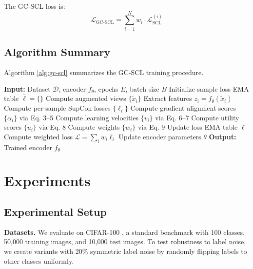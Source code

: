 \documentclass{article}
\begin{document}
The GC-SCL loss is:
\begin{equation}
\mathcal{L}_{\text{GC-SCL}} = \sum_{i=1}^N w_i \cdot \mathcal{L}_{\text{SCL}}^{(i)}
\end{equation}

\subsection{Algorithm Summary}

Algorithm \ref{alg:gc-scl} summarizes the GC-SCL training procedure.

\begin{algorithm}[t]
\caption{GC-SCL Training}
\label{alg:gc-scl}
\begin{algorithmic}
\STATE \textbf{Input:} Dataset $\mathcal{D}$, encoder $f_\theta$, epochs $E$, batch size $B$
\STATE Initialize sample loss EMA table $\bar{\ell} = \{\}$
        \STATE Compute augmented views $\{\tilde{x}_i\}$
        \STATE Extract features $z_i = f_\theta(\tilde{x}_i)$
        \STATE Compute per-sample SupCon losses $\{\ell_i\}$
        \STATE Compute gradient alignment scores $\{\alpha_i\}$ via Eq. 3--5
        \STATE Compute learning velocities $\{v_i\}$ via Eq. 6--7
        \STATE Compute utility scores $\{u_i\}$ via Eq. 8
        \STATE Compute weights $\{w_i\}$ via Eq. 9
        \STATE Update loss EMA table $\bar{\ell}$
        \STATE Compute weighted loss $\mathcal{L} = \sum_i w_i \ell_i$
        \STATE Update encoder parameters $\theta$
    \ENDFOR
\ENDFOR
\STATE \textbf{Output:} Trained encoder $f_\theta$
\end{algorithmic}
\end{algorithm}

\section{Experiments}

\subsection{Experimental Setup}

\textbf{Datasets.} We evaluate on CIFAR-100 \citep{krizhevsky2009learning}, a standard benchmark with 100 classes, 50,000 training images, and 10,000 test images. To test robustness to label noise, we create variants with 20\% symmetric label noise by randomly flipping labels to other classes uniformly.
\end{document}
